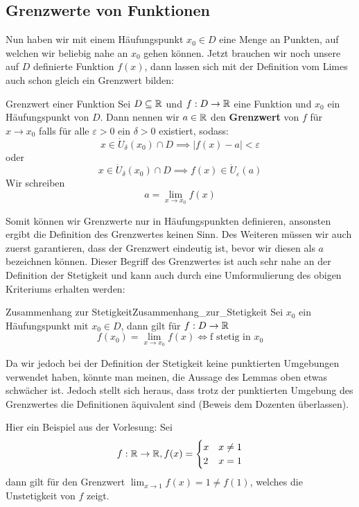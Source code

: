\subsection{Grenzwerte von Funktionen}
Nun haben wir mit einem Häufungspunkt $x_0 \in D$ eine Menge an Punkten, auf welchen wir beliebig nahe an $x_0$ gehen können. Jetzt brauchen wir noch unsere auf $D$ definierte Funktion $f(x)$, dann lassen sich mit der Definition vom Limes auch schon gleich ein Grenzwert bilden:

\begin{definition}{Grenzwert einer Funktion}{}
Sei $D \subseteq \mathbb{R}$ und $f: D \to \mathbb{R}$ eine Funktion und $x_0$ ein Häufungspunkt von $D$. Dann nennen wir $a \in \mathbb{R}$ den \textbf{Grenzwert} von $f$ für $x \to x_0$ falls für alle $\varepsilon>0$ ein $\delta>0$ existiert, sodass:
$$x\in\dot{U}_\delta(x_0) \cap D \implies | f(x) - a | < \varepsilon$$
oder
$$x\in\dot{U}_\delta(x_0) \cap D \implies  f(x) \in \dot{U}_\varepsilon(a)$$
Wir schreiben 
$$a = \lim_{x \to x_0}{f(x)}$$
\end{definition}

Somit können wir Grenzwerte nur in Häufungspunkten definieren, ansonsten ergibt die Definition des Grenzwertes keinen Sinn. Des Weiteren müssen wir auch zuerst garantieren, dass der Grenzwert eindeutig ist, bevor wir diesen als $a$ bezeichnen können. Dieser Begriff des Grenzwertes ist auch sehr nahe an der Definition der Stetigkeit und kann auch durch eine Umformulierung des obigen Kriteriums erhalten werden:

\begin{lemma}{Zusammenhang zur Stetigkeit}{Zusammenhang_zur_Stetigkeit}
Sei $x_0$ ein Häufungspunkt mit $x_0 \in D$, dann gilt für $f: D \to \mathbb{R}$
$$f(x_0) = \lim_{x \to x_0}{f(x)} \iff \text{f stetig in } x_0$$
\end{lemma}

Da wir jedoch bei der Definition der Stetigkeit keine punktierten Umgebungen verwendet haben, könnte man meinen, die Aussage des Lemmas oben etwas schwächer ist. Jedoch stellt sich heraus, dass trotz der punktierten Umgebung des Grenzwertes die Definitionen äquivalent sind (Beweis dem Dozenten überlassen).

\begin{example}\label{07b1}
Hier ein Beispiel aus der Vorlesung: Sei
$$f: \mathbb{R} \to \mathbb{R}, f(x)=\begin{cases}x & x \ne 1\\2 & x = 1\end{cases}$$
dann gilt für den Grenzwert $\lim_{x \to 1}{f(x)} = 1 \ne f(1)$, welches die Unstetigkeit von $f$ zeigt.
\end{example}

